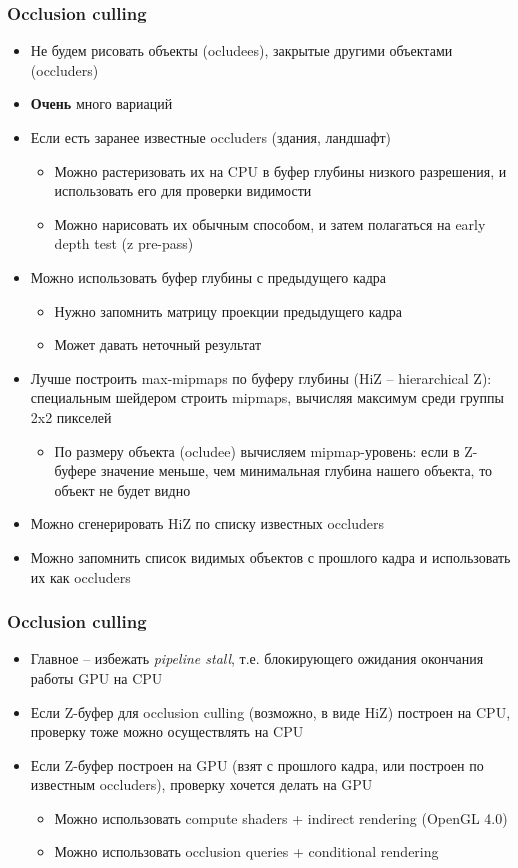 \documentclass{beamer}
\begin{document}
\begin{frame}[fragile]
\fontsize{10pt}{10pt}
\frametitle{Occlusion culling}
\begin{itemize}
\item Не будем рисовать объекты (ocludees), закрытые другими объектами (occluders)
\pause
\item \textbf{Очень} много вариаций
\pause
\item Если есть заранее известные occluders (здания, ландшафт)
\pause
\begin{itemize}
\item Можно растеризовать их на CPU в буфер глубины низкого разрешения, и использовать его для проверки видимости
\pause
\item Можно нарисовать их обычным способом, и затем полагаться на early depth test (z pre-pass)
\end{itemize}
\pause
\item Можно использовать буфер глубины с предыдущего кадра
\pause
\begin{itemize}
\item Нужно запомнить матрицу проекции предыдущего кадра
\pause
\item Может давать неточный результат
\end{itemize}
\pause
\item Лучше построить max-mipmaps по буферу глубины (HiZ -- hierarchical Z): специальным шейдером строить mipmaps, вычисляя максимум среди группы 2x2 пикселей
\pause
\begin{itemize}
\item По размеру объекта (ocludee) вычисляем mipmap-уровень: если в Z-буфере значение меньше, чем минимальная глубина нашего объекта, то объект не будет видно
\end{itemize}
\pause
\item Можно сгенерировать HiZ по списку известных occluders
\pause
\item Можно запомнить список видимых объектов с прошлого кадра и использовать их как occluders
\end{itemize}
\end{frame}

\begin{frame}[fragile]
\frametitle{Occlusion culling}
\begin{itemize}
\item Главное -- избежать \textit{pipeline stall}, т.е. блокирующего ожидания окончания работы GPU на CPU
\pause
\item Если Z-буфер для occlusion culling (возможно, в виде HiZ) построен на CPU, проверку тоже можно осуществлять на CPU
\pause
\item Если Z-буфер построен на GPU (взят с прошлого кадра, или построен по известным occluders), проверку хочется делать на GPU
\pause
\begin{itemize}
\item Можно использовать compute shaders + indirect rendering (OpenGL 4.0)
\pause
\item Можно использовать occlusion queries + conditional rendering
\end{itemize}
\end{itemize}
\end{frame}
\end{document}
